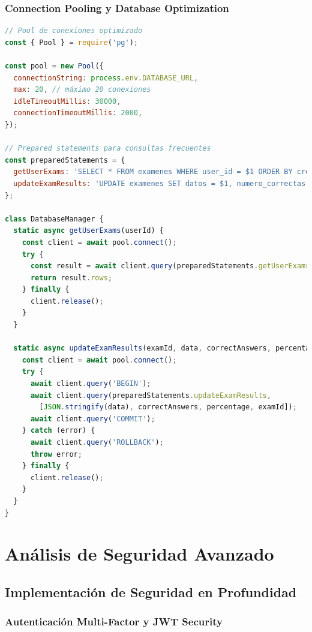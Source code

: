 \documentclass[12pt,a4paper]{report}
\begin{document}
\subsubsection{Connection Pooling y Database Optimization}

\begin{lstlisting}[language=JavaScript, caption=Optimización de conexiones a base de datos]
// Pool de conexiones optimizado
const { Pool } = require('pg');

const pool = new Pool({
  connectionString: process.env.DATABASE_URL,
  max: 20, // máximo 20 conexiones
  idleTimeoutMillis: 30000,
  connectionTimeoutMillis: 2000,
});

// Prepared statements para consultas frecuentes
const preparedStatements = {
  getUserExams: 'SELECT * FROM examenes WHERE user_id = $1 ORDER BY created_at DESC',
  updateExamResults: 'UPDATE examenes SET datos = $1, numero_correctas = $2, puntaje_porcentaje = $3 WHERE id = $4'
};

class DatabaseManager {
  static async getUserExams(userId) {
    const client = await pool.connect();
    try {
      const result = await client.query(preparedStatements.getUserExams, [userId]);
      return result.rows;
    } finally {
      client.release();
    }
  }
  
  static async updateExamResults(examId, data, correctAnswers, percentage) {
    const client = await pool.connect();
    try {
      await client.query('BEGIN');
      await client.query(preparedStatements.updateExamResults, 
        [JSON.stringify(data), correctAnswers, percentage, examId]);
      await client.query('COMMIT');
    } catch (error) {
      await client.query('ROLLBACK');
      throw error;
    } finally {
      client.release();
    }
  }
}
\end{lstlisting}

\section{Análisis de Seguridad Avanzado}

\subsection{Implementación de Seguridad en Profundidad}

\subsubsection{Autenticación Multi-Factor y JWT Security}
\end{document}
